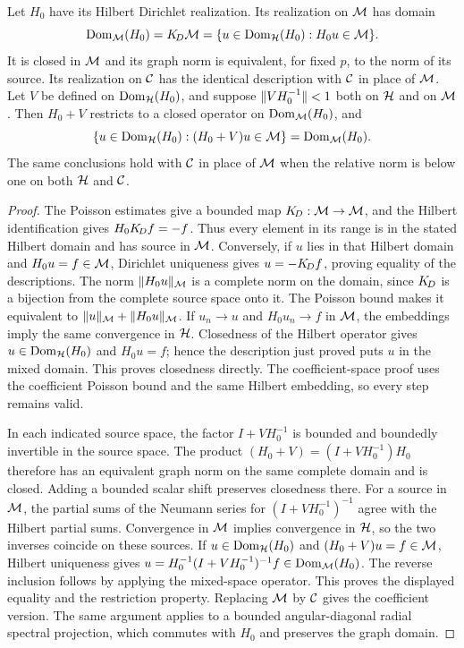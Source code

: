 \begin{lemma}\label{inf:mixed-domain}
Let $H_0$ have its Hilbert Dirichlet realization. Its realization
on $\mathcal M$ has domain
\[
 \operatorname{Dom}_{\mathcal M}(H_0)=K_{\!D}\mathcal M
 =\{u\in\operatorname{Dom}_{\mathcal{H}}(H_0):H_0u\in\mathcal M\}.
\]
It is closed in $\mathcal M$ and its graph norm is equivalent, for
fixed $p$, to the norm of its source. Its realization on $\mathcal C$
has the identical description with $\mathcal C$ in place of $\mathcal M$.
Let $V$ be defined on $\operatorname{Dom}_{\mathcal{H}}(H_0)$, and suppose
$\lVert VH_0^{-1}\rVert<1$ both on $\mathcal{H}$ and on $\mathcal M$.
Then $H_0+V$ restricts to a closed operator on
$\operatorname{Dom}_{\mathcal M}(H_0)$, and
\[
 \{u\in\operatorname{Dom}_{\mathcal{H}}(H_0):(H_0+V)u\in\mathcal M\}
 =\operatorname{Dom}_{\mathcal M}(H_0).
\]
The same conclusions hold with $\mathcal C$ in place of $\mathcal M$ when
the relative norm is below one on both $\mathcal{H}$ and $\mathcal C$.
\end{lemma}
\begin{proof}
The Poisson estimates give a bounded map $K_{\!D}:\mathcal M\to\mathcal M$,
and the Hilbert identification gives $H_0K_{\!D} f=-f$.
Thus every element in its range is in the stated Hilbert domain
and has source in $\mathcal M$.
Conversely, if $u$ lies in that Hilbert domain and $H_0u=f\in\mathcal M$,
Dirichlet uniqueness gives $u=-K_{\!D} f$, proving equality of the
descriptions. The norm $\lVert H_0u\rVert_{\mathcal M}$ is a complete norm
on the domain, since $K_{\!D}$ is a bijection from the complete
source space onto it. The Poisson bound makes it equivalent to
$\lVert u\rVert_{\mathcal M}+\lVert H_0u\rVert_{\mathcal M}$.
If $u_n\to u$ and $H_0u_n\to f$ in $\mathcal M$, the embeddings
imply the same convergence in $\mathcal{H}$. Closedness of the Hilbert
operator gives $u\in\operatorname{Dom}_{\mathcal{H}}(H_0)$ and $H_0u=f$; hence the
description just proved puts $u$ in the mixed domain. This
proves closedness directly.
The coefficient-space proof uses the coefficient Poisson bound
and the same Hilbert embedding, so every step remains valid.

In each indicated source space, the factor
$I+VH_0^{-1}$ is bounded and boundedly invertible in the source
space. The product
$(H_0+V)=(I+VH_0^{-1})H_0$ therefore has an equivalent graph norm
on the same complete domain and is closed. Adding a bounded
scalar shift preserves closedness there.
For a source in $\mathcal M$, the partial sums of the Neumann series
for $(I+VH_0^{-1})^{-1}$ agree with the Hilbert partial sums.
Convergence in $\mathcal M$ implies convergence in $\mathcal{H}$, so the
two inverses coincide on these sources. If
$u\in\operatorname{Dom}_{\mathcal{H}}(H_0)$ and $(H_0+V)u=f\in\mathcal M$, Hilbert
uniqueness gives
$u=H_0^{-1}(I+VH_0^{-1})^{-1}f\in\operatorname{Dom}_{\mathcal M}(H_0)$.
The reverse inclusion follows by applying the mixed-space
operator. This proves the displayed equality and the restriction
property. Replacing $\mathcal M$ by $\mathcal C$ gives the coefficient
version. The same argument applies to
a bounded angular-diagonal radial spectral projection, which
commutes with $H_0$ and preserves the graph domain.
\end{proof}

